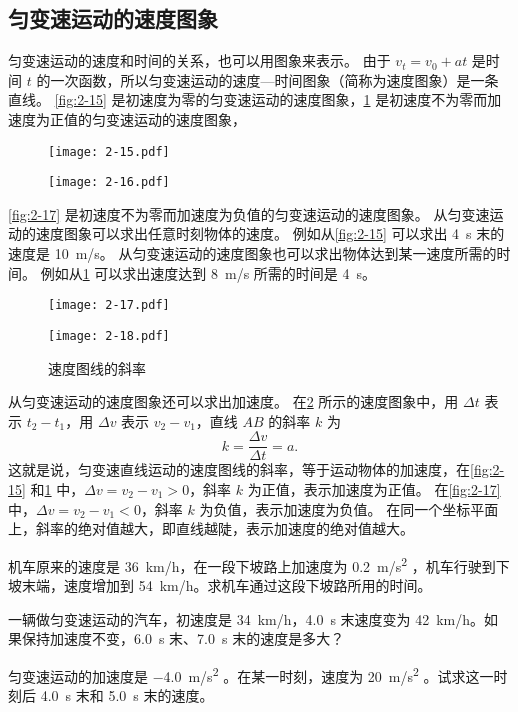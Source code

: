 \subsection{匀变速运动的速度图象}
匀变速运动的速度和时间的关系，也可以用图象来表示。
由于 $v_t=v_0+at$ 是时间 $t$ 的一次函数，所以匀变速运动的速度—时间图象（简称为速度图象）是一条直线。
\cref{fig:2-15} 是初速度为零的匀变速运动的速度图象，\cref{fig:2-16} 是初速度不为零而加速度为正值的匀变速运动的速度图象，
\begin{figure}
  \begin{minipage}[b]{0.48\linewidth}
    \centering
    \texttt{[image: 2-15.pdf]}
    \caption{}\label{fig:2-15}
  \end{minipage}
  \begin{minipage}[b]{0.48\linewidth}
    \centering
    \texttt{[image: 2-16.pdf]}
    \caption{}\label{fig:2-16}
  \end{minipage}
\end{figure}
\cref{fig:2-17} 是初速度不为零而加速度为负值的匀变速运动的速度图象。
从匀变速运动的速度图象可以求出任意时刻物体的速度。
例如从\cref{fig:2-15} 可以求出 \qty{4}{s} 末的速度是 \qty{10}{m/s}。
从匀变速运动的速度图象也可以求出物体达到某一速度所需的时间。
例如从\cref{fig:2-16} 可以求出速度达到 \qty{8}{m/s} 所需的时间是 \qty{4}{s}。

\begin{figure}
\begin{minipage}[b]{0.48\linewidth}
\centering
\texttt{[image: 2-17.pdf]}
\caption{}\label{fig:2-17}
\end{minipage}
\begin{minipage}[b]{0.48\linewidth}
\centering
\texttt{[image: 2-18.pdf]}
\caption{速度图线的斜率}\label{fig:2-18}
\end{minipage}
\end{figure}

从匀变速运动的速度图象还可以求出加速度。
在\cref{fig:2-18} 所示的速度图象中，用 $\Delta t$ 表示 $t_2-t_1$，用 $\Delta v$ 表示 $v_2-v_1$，直线 $AB$ 的斜率 $k$ 为
\[k=\frac{\Delta v}{\Delta t}=a.\]
这就是说，匀变速直线运动的速度图线的斜率，等于运动物体的加速度，在\cref{fig:2-15} 和\cref{fig:2-16} 中，$\Delta v=v_2-v_1>0$，斜率 $k$ 为正值，表示加速度为正值。
在\cref{fig:2-17} 中，$\Delta v=v_2-v_1<0$，斜率 $k$ 为负值，表示加速度为负值。
在同一个坐标平面上，斜率的绝对值越大，即直线越陡，表示加速度的绝对值越大。

\begin{Practice}
\begin{question}
\item 机车原来的速度是 \qty{36}{km/h}，在一段下坡路上加速度为 \qty{0.2}{m/s^2} ，机车行驶到下坡末端，速度增加到 \qty{54}{km/h}。求机车通过这段下坡路所用的时间。
\item 一辆做匀变速运动的汽车，初速度是 \qty{34}{km/h}，\qty{4.0}{s} 末速度变为 \qty{42}{km/h}。如果保持加速度不变，\qty{6.0}{s} 末、\qty{7.0}{s} 末的速度是多大？
\item 匀变速运动的加速度是 \qty{-4.0}{m/s^2} 。在某一时刻，速度为 \qty{20}{m/s^2} 。试求这一时刻后 \qty{4.0}{s} 末和 \qty{5.0}{s} 末的速度。
\end{question}
\end{Practice}

